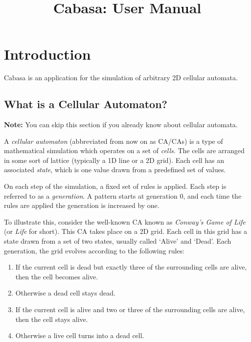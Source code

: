\documentclass[oneside,a4paper]{memoir}
\begin{document}
\title{Cabasa: User Manual}
\preauthor{}\postauthor{}\author{} %
\maketitle

\tableofcontents

\chapter{Introduction}

Cabasa is an application for the simulation of arbitrary 2D cellular automata.

\section{What is a Cellular Automaton?}
\label{sec:whatisca}

\textbf{Note:} You can skip this section if you already know about cellular automata.

\vspace{2ex}

A \emph{cellular automaton} (abbreviated from now on as CA/CAs) is a type of mathematical simulation which operates on a set of \emph{cells}.
The cells are arranged in some sort of lattice (typically a 1D line or a 2D grid).
Each cell has an associated \emph{state}, which is one value drawn from a predefined set of values.

On each step of the simulation, a fixed set of rules is applied.
Each step is referred to as a \emph{generation}.
A pattern starts at generation 0, and each time the rules are applied the generation is increased by one.

To illustrate this, consider the well-known CA known as \emph{Conway's Game of Life} (or \emph{Life} for short).
This CA takes place on a 2D grid.
Each cell in this grid has a state drawn from a set of two states, usually called `Alive' and `Dead'.
Each generation, the grid evolves according to the following rules:

\begin{enumerate}
\item \label{itm:gold3} If the current cell is dead but exactly three of the surrounding cells are alive, then the cell becomes alive.
\item \label{itm:goldo} Otherwise a dead cell stays dead.
\item \label{itm:gola23} If the current cell is alive and two or three of the surrounding cells are alive, then the cell stays alive.
\item \label{itm:golao} Otherwise a live cell turns into a dead cell.
\end{enumerate}
\end{document}
